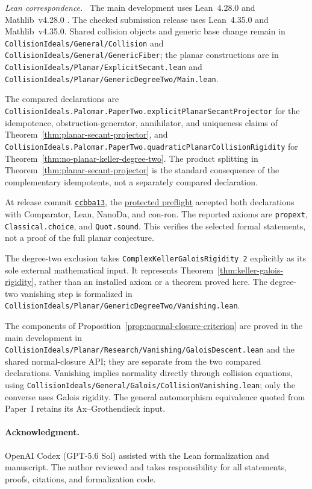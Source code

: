 \documentclass[11pt]{article}
\newcommand{\leanpath}[1]{\texttt{\nolinkurl{#1}}}
\newenvironment{leanfiles}
  {\par\medskip\begingroup\footnotesize\raggedright\noindent
   \textit{Lean correspondence.}\ }
  {\par\endgroup\medskip}
\begin{document}
\begin{leanfiles}
The main development uses Lean~4.28.0 and Mathlib~v4.28.0
\cite{Lean4,Mathlib}.  The checked submission release uses Lean~4.35.0 and
Mathlib~v4.35.0.  Shared collision objects and generic base change remain in
\leanpath{CollisionIdeals/General/Collision} and
\leanpath{CollisionIdeals/General/GenericFiber}; the planar constructions
are in \leanpath{CollisionIdeals/Planar/ExplicitSecant.lean} and
\leanpath{CollisionIdeals/Planar/GenericDegreeTwo/Main.lean}.

The compared declarations are
\leanpath{CollisionIdeals.Palomar.PaperTwo.explicitPlanarSecantProjector}
for the idempotence, obstruction-generator, annihilator, and uniqueness
claims of Theorem~\ref{thm:planar-secant-projector}, and
\leanpath{CollisionIdeals.Palomar.PaperTwo.quadraticPlanarCollisionRigidity}
for Theorem~\ref{thm:no-planar-keller-degree-two}.
The product splitting in Theorem~\ref{thm:planar-secant-projector} is the
standard consequence of the complementary idempotents, not a separately
compared declaration.

At release commit
\href{https://github.com/what-social-construct/jacobian-collision-geometry/tree/ccbba1356d6e737e1e7dd336a7014360e2f52251}
{\texttt{ccbba13}}, the
\href{https://github.com/what-social-construct/jacobian-collision-geometry/actions/runs/41967486280}
{protected preflight}
accepted both declarations with Comparator, Lean, NanoDa, and con-ron.
The reported axioms are \texttt{propext}, \texttt{Classical.choice}, and
\texttt{Quot.sound}.  This verifies the selected formal statements, not a
proof of the full planar conjecture.

The degree-two exclusion takes
\texttt{ComplexKellerGaloisRigidity 2} explicitly as its sole external
mathematical input.  It represents
Theorem~\ref{thm:keller-galois-rigidity}, rather than an installed axiom or
a theorem proved here.  The degree-two vanishing step is formalized in
\leanpath{CollisionIdeals/Planar/GenericDegreeTwo/Vanishing.lean}.

The components of Proposition~\ref{prop:normal-closure-criterion} are proved
in the main development in
\leanpath{CollisionIdeals/Planar/Research/Vanishing/GaloisDescent.lean}
and the shared normal-closure API; they are separate from the two compared
declarations.  Vanishing implies normality directly through collision
equations, using
\leanpath{CollisionIdeals/General/Galois/CollisionVanishing.lean};
only the converse uses Galois rigidity.  The general automorphism
equivalence quoted from Paper~I retains its Ax--Grothendieck input.
\end{leanfiles}

\paragraph{Acknowledgment.}
OpenAI Codex (GPT-5.6 Sol) assisted with the Lean formalization and
manuscript.  The author reviewed and takes responsibility for all
statements, proofs, citations, and formalization code.

\begingroup
\raggedright


\endgroup
\end{document}
